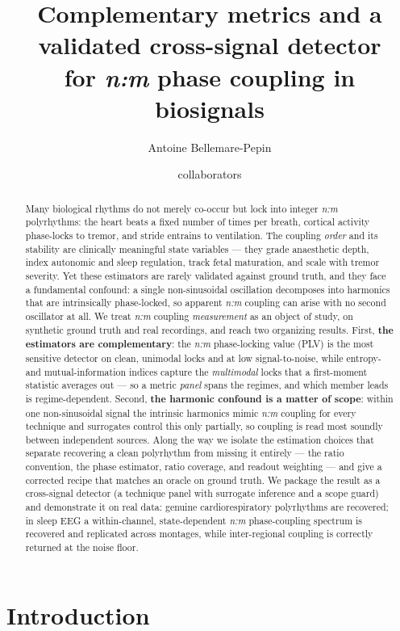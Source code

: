 \documentclass[11pt]{article}
\title{\bfseries Complementary metrics and a validated cross-signal detector\\
for \textit{n:m} phase coupling in biosignals}
\author[ ]{Antoine Bellemare-Pepin \and collaborators}
\affil[ ]{\small \textit{Draft for internal review.}}
\date{}
\begin{document}
\maketitle

\begin{abstract}
\noindent
Many biological rhythms do not merely co-occur but lock into integer \textit{n:m} polyrhythms: the heart
beats a fixed number of times per breath, cortical activity phase-locks to tremor, and stride entrains to
ventilation. The coupling \emph{order} and its stability are clinically meaningful state variables ---
they grade anaesthetic depth, index autonomic and sleep regulation, track fetal maturation, and scale
with tremor severity. Yet these estimators are rarely validated against ground truth, and they face a fundamental confound: a
single non-sinusoidal oscillation decomposes into harmonics that are intrinsically phase-locked, so
apparent \textit{n:m} coupling can arise with no second oscillator at all. We treat \textit{n:m} coupling
\emph{measurement} as an object of study, on synthetic ground truth and real recordings, and reach two
organizing results. First, \textbf{the estimators are complementary}: the \textit{n:m} phase-locking
value (PLV) is the most sensitive detector on clean, unimodal locks and at low signal-to-noise, while
entropy- and mutual-information indices capture the \emph{multimodal} locks that a first-moment statistic
averages out --- so a metric \emph{panel} spans the regimes, and which member leads is regime-dependent.
Second, \textbf{the harmonic confound is a matter of scope}: within one non-sinusoidal signal the
intrinsic harmonics mimic \textit{n:m} coupling for every technique and surrogates control this only
partially, so coupling is read most soundly between independent sources. Along the way we isolate the estimation choices that
separate recovering a clean polyrhythm from missing it entirely --- the ratio convention, the phase
estimator, ratio coverage, and readout weighting --- and give a corrected recipe that matches an oracle on
ground truth. We package the result as a cross-signal detector (a technique panel with surrogate inference
and a scope guard) and demonstrate it on real data: genuine cardiorespiratory polyrhythms are recovered;
in sleep EEG a within-channel, state-dependent \textit{n:m} phase-coupling spectrum is recovered and
replicated across montages, while inter-regional coupling is correctly returned at the noise floor.
\end{abstract}

\section{Introduction}
\end{document}
